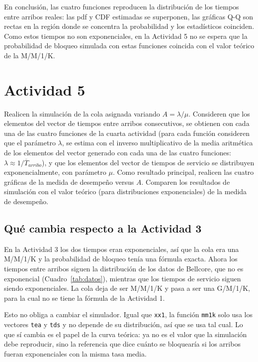 \documentclass[12pt]{article}
\begin{document}
En conclusión, las cuatro funciones reproducen la distribución de los tiempos entre arribos reales: las pdf y CDF estimadas se superponen, las gráficas Q-Q son rectas en la región donde se concentra la probabilidad y los estadísticos coinciden. Como estos tiempos no son exponenciales, en la Actividad 5 no se espera que la probabilidad de bloqueo simulada con estas funciones coincida con el valor teórico de la M/M/1/K.

\section{Actividad 5}
 
Realicen la simulación de la cola asignada variando $A=\lambda/\mu$. Consideren que los elementos del vector de tiempos entre arribos consecutivos, se obtienen con cada una de las cuatro funciones de la cuarta actividad (para cada función consideren que el parámetro $\lambda$, se estima con el inverso multiplicativo de la media aritmética de los elementos del vector generado con cada una de las cuatro funciones: $\lambda\approx 1/\overline{T}_{arribo}$), y que los elementos del vector de tiempos de servicio se distribuyen exponencialmente, con parámetro $\mu$. Como resultado principal, realicen las cuatro gráficas de la medida de desempeño versus $A$. Comparen los resultados de simulación con el valor teórico (para distribuciones exponenciales) de la medida de desempeño.
 
\subsection{Qué cambia respecto a la Actividad 3}
 
En la Actividad 3 los dos tiempos eran exponenciales, así que la cola era una M/M/1/K y la probabilidad de bloqueo tenía una fórmula exacta. Ahora los tiempos entre arribos siguen la distribución de los datos de Bellcore, que no es exponencial (Cuadro~\ref{tab:datos}), mientras que los tiempos de servicio siguen siendo exponenciales. La cola deja de ser M/M/1/K y pasa a ser una G/M/1/K, para la cual no se tiene la fórmula de la Actividad 1.
 
Esto no obliga a cambiar el simulador. Igual que \texttt{xx1}, la función \texttt{mm1k} solo usa los vectores \texttt{tea} y \texttt{tds} y no depende de su distribución, así que se usa tal cual. Lo que sí cambia es el papel de la curva teórica: ya no es el valor que la simulación debe reproducir, sino la referencia que dice cuánto se bloquearía si los arribos fueran exponenciales con la misma tasa media.
 
\end{document}
